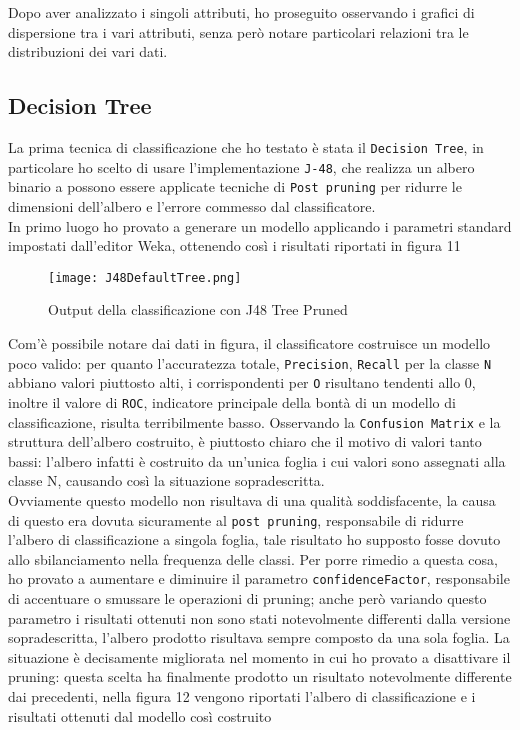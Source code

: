 Dopo aver analizzato i singoli attributi, ho proseguito osservando i grafici di dispersione tra i vari attributi, senza però notare particolari relazioni tra le distribuzioni dei vari dati.

  
  
  \subsection{Decision Tree}
  La prima tecnica di classificazione che ho testato è stata il \texttt{Decision Tree}, in particolare ho scelto di usare l'implementazione \texttt{J-48}, che realizza un albero binario a possono essere applicate tecniche di \texttt{Post pruning} per ridurre le dimensioni dell'albero e l'errore commesso dal classificatore.\\
  In primo luogo ho provato a generare un modello applicando i parametri standard impostati dall'editor Weka, ottenendo così i risultati riportati in figura 11
  
  \begin{figure}[H]
  	\texttt{[image: J48DefaultTree.png]}
  	\caption{Output della classificazione con J48 Tree Pruned}
  \end{figure}

Com'è possibile notare dai dati in figura, il classificatore costruisce un modello poco valido: per quanto l'accuratezza totale, \texttt{Precision}, \texttt{Recall} per la classe \texttt{N} abbiano valori piuttosto alti, i corrispondenti per \texttt{O} risultano tendenti allo 0, inoltre il valore di \texttt{ROC}, indicatore principale della bontà di un modello di classificazione, risulta terribilmente basso. Osservando la \texttt{Confusion Matrix} e la struttura dell'albero costruito, è piuttosto chiaro che il motivo di valori tanto bassi: l'albero infatti è costruito da un'unica foglia i cui valori sono assegnati alla classe N, causando così la situazione sopradescritta.\\
Ovviamente questo modello non risultava di una qualità soddisfacente, la causa di questo era dovuta sicuramente al \texttt{post pruning}, responsabile di ridurre l'albero di classificazione a singola foglia, tale risultato ho supposto fosse dovuto allo sbilanciamento nella frequenza delle classi.
Per porre rimedio a questa cosa, ho provato a aumentare e diminuire il parametro \texttt{confidenceFactor}, responsabile di accentuare o smussare le operazioni di pruning; anche però variando questo parametro i risultati ottenuti non sono stati notevolmente differenti dalla versione sopradescritta, l'albero prodotto risultava sempre composto da una sola foglia.
La situazione è decisamente migliorata nel momento in cui ho provato a disattivare il pruning: questa scelta ha finalmente prodotto un risultato notevolmente differente dai precedenti, nella figura 12  vengono riportati l'albero di classificazione e i risultati ottenuti dal modello così costruito

